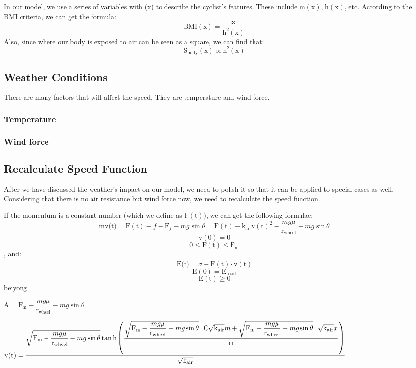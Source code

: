 \documentclass[14pt]{article}
\begin{document}
	In our model, we use a series of variables with (x) to describe the cyclist's features. These include $\mathrm{m}(\mathrm{x})$, $\mathrm{h}(\mathrm{x})$, etc. According to the BMI criteria, we can get the formula:
	$$\mathrm{BMI}(\mathrm{x})=\dfrac{\mathrm{x}}{\mathrm{h}^2(\mathrm{x})}$$
	Also, since where our body is exposed to air can be seen as a square, we can find that:
	$$\mathrm{S}_\mathrm{body}(\mathrm{x})\propto\mathrm{h}^2(\mathrm{x})$$
	\subsection{Weather Conditions}
	There are many factors that will affect the speed. They are temperature and wind force. 
	\subsubsection{Temperature}
	\subsubsection{Wind force}
	\subsection{Recalculate Speed Function}
	After we have discussed the weather's impact on our model, we need to polish it so that it can be applied to special cases as well. Considering that there is no air resistance but wind force now, we need to recalculate the speed function.

	If the momentum is a constant number (which we define as $\mathrm{F}(\mathrm{t})$), we can get the following formulae:
	$$\mathrm{m}\mathrm{v}\dot(\mathrm{t})=\mathrm{F}(\mathrm{t})-f-\mathrm{F}_{f}-mg\sin \theta=\mathrm{F}(\mathrm{t})-\mathrm{k}_\mathrm{air}{\mathrm{v}(\mathrm{t})}^2-\dfrac{mg\mu}{\mathrm{r}_\mathrm{wheel}}-mg\sin \theta$$
	$$\mathrm{v}(0)=0$$
	$$0\leq\mathrm{F}(\mathrm{t})\leq\mathrm{F}_\mathrm{m}$$
	, and:
	$$\mathrm{E}\dot(\mathrm{t})=\sigma-\mathrm{F}(\mathrm{t})\cdot\mathrm{v}(\mathrm{t})$$
	$$\mathrm{E}(0)=\mathrm{E}_\mathrm{total}$$
	$$\mathrm{E}(\mathrm{t})\geq0$$
	beiyong
	
	$\mathrm{A}=\mathrm{F}_\mathrm{m}-\dfrac{mg\mu}{\mathrm{r}_\mathrm{wheel}}-mg\sin \theta$

	$\mathrm{v}(\mathrm{t})\\=\\\dfrac{\sqrt{\mathrm{F}_\mathrm{m}-\dfrac{mg\mu}{\mathrm{r}_\mathrm{wheel}}-mg\sin \theta} \tan \mathrm{h} \left(\dfrac{\sqrt{\mathrm{F}_\mathrm{m}-\dfrac{mg\mu}{\mathrm{r}_\mathrm{wheel}}-mg\sin \theta}\ \ \mathrm{C}\sqrt{\mathrm{k}_\mathrm{air}} m+\sqrt{\mathrm{F}_\mathrm{m}-\dfrac{mg\mu}{\mathrm{r}_\mathrm{wheel}}-mg\sin \theta}\ \ \sqrt{\mathrm{k}_\mathrm{air}} x}{\mathrm{m}}\right)}{\sqrt{\mathrm{k}_\mathrm{air}}}$
\end{document}
